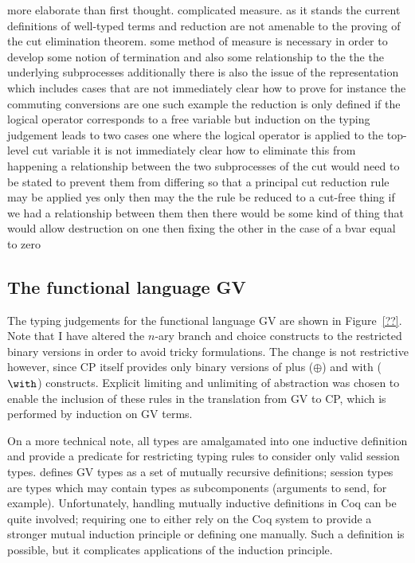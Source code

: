 more elaborate than first thought. complicated measure.  as it stands the
current definitions of well-typed terms and reduction are not amenable to the
proving of the cut elimination theorem. some method of measure is necessary in
order to develop some notion of termination and also some relationship to the
the the underlying subprocesses additionally there is also the issue of the
representation which includes cases that are not immediately clear how to
prove for instance the commuting conversions are one such example the
reduction is only defined if the logical operator corresponds to a free
variable but induction on the typing judgement leads to two cases one where
the logical operator is applied to the top-level cut variable it is not
immediately clear how to eliminate this from happening a relationship between
the two subprocesses of the cut would need to be stated to prevent them from
differing so that a principal cut reduction rule may be applied yes only then
may the the rule be reduced to a cut-free thing if we had a relationship
between them then there would be some kind of thing that would allow
destruction on one then fixing the other in the case of a bvar equal to zero

\subsection{The functional language GV}\label{sec:gv}

\begin{comment}
FIGURES

types

terms
\end{comment}



The typing judgements for the functional language GV are shown in
Figure~\ref{??}. Note that I have altered the $n$-ary branch and choice
constructs to the restricted binary versions in order to avoid tricky
formulations. The change is not restrictive however, since CP itself provides
only binary versions of plus ($\oplus$) and with ($\with$)
constructs. Explicit limiting and unlimiting of abstraction was chosen to
enable the inclusion of these rules in the translation from GV to CP, which is
performed by induction on GV terms.

On a more technical note, all types are amalgamated into one inductive
definition and provide a predicate for restricting typing rules to consider
only valid session types. \citeauthor{Wadler:2014} defines GV types as a set
of mutually recursive definitions; session types are types which may contain
types as subcomponents (arguments to send, for example). Unfortunately,
handling mutually inductive definitions in Coq can be quite involved;
requiring one to either rely on the Coq system to provide a stronger mutual
induction principle or defining one manually. Such a definition is possible,
but it complicates applications of the induction principle.

